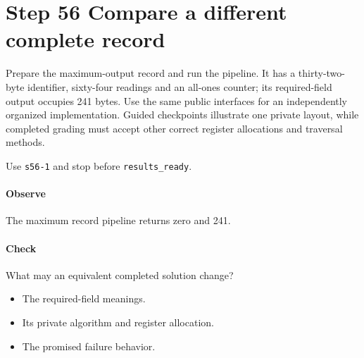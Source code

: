 \section{Step 56 Compare a different complete record}\label{cbor-s56}
Prepare the maximum-output record and run the pipeline. It has a thirty-two-byte identifier, sixty-four readings and an all-ones counter; its required-field output occupies 241 bytes. Use the same public interfaces for an independently organized implementation. Guided checkpoints illustrate one private layout, while completed grading must accept other correct register allocations and traversal methods.

Use \texttt{s56-1} and stop before \texttt{results\_ready}.

\paragraph{Observe} The maximum record pipeline returns zero and 241.

\paragraph{Check} What may an equivalent completed solution change?
\begin{itemize}
  \item[A.] The required-field meanings.
  \item[B.] Its private algorithm and register allocation.
  \item[C.] The promised failure behavior.
\end{itemize}
